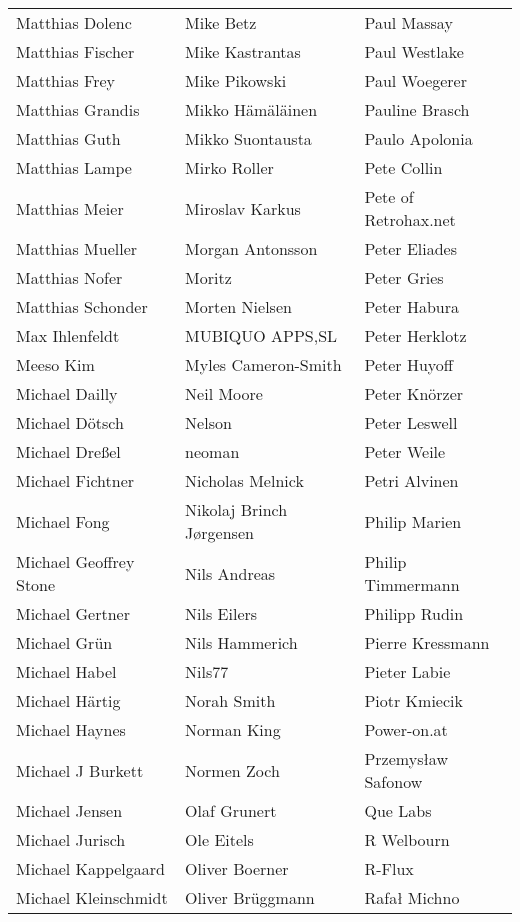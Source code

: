 \begin{small}
\begin{tabular}{p{4cm}p{4cm}p{4cm}}
Matthias Dolenc & Mike Betz & Paul Massay \\
Matthias Fischer & Mike Kastrantas & Paul Westlake \\
Matthias Frey & Mike Pikowski & Paul Woegerer \\
Matthias Grandis & Mikko Hämäläinen & Pauline Brasch \\
Matthias Guth & Mikko Suontausta & Paulo Apolonia \\
Matthias Lampe & Mirko Roller & Pete Collin \\
Matthias Meier & Miroslav Karkus & Pete of Retrohax.net \\
Matthias Mueller & Morgan Antonsson & Peter Eliades \\
Matthias Nofer & Moritz & Peter Gries \\
Matthias Schonder & Morten Nielsen & Peter Habura \\
Max Ihlenfeldt & MUBIQUO APPS,SL & Peter Herklotz \\
Meeso Kim & Myles Cameron-Smith & Peter Huyoff \\
Michael Dailly & Neil Moore & Peter Knörzer \\
Michael Dötsch & Nelson & Peter Leswell \\
Michael Dreßel & neoman & Peter Weile \\
Michael Fichtner & Nicholas Melnick & Petri Alvinen \\
Michael Fong & Nikolaj Brinch Jørgensen & Philip Marien \\
Michael Geoffrey Stone & Nils Andreas & Philip Timmermann \\
Michael Gertner & Nils Eilers & Philipp Rudin \\
Michael Grün & Nils Hammerich & Pierre Kressmann \\
Michael Habel & Nils77 & Pieter Labie \\
Michael Härtig & Norah Smith & Piotr Kmiecik \\
Michael Haynes & Norman King & Power-on.at \\
Michael J Burkett & Normen Zoch & Przemysław Safonow \\
Michael Jensen & Olaf Grunert & Que Labs \\
Michael Jurisch & Ole Eitels & R Welbourn \\
Michael Kappelgaard & Oliver Boerner & R-Flux \\
Michael Kleinschmidt & Oliver Brüggmann & Rafał Michno \\

\end{tabular}
\end{small}

